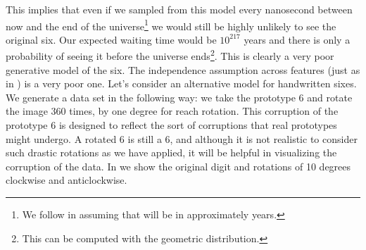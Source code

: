 This implies that even if we sampled from this model every nanosecond
between now and the end of the universe\footnote{We follow
  \cite{MacKay:information03} in assuming that will be in
  approximately  years.} we would still be highly
unlikely to see the original six. Our expected waiting time would be
$10^{217}$ years and there is only a  probability of seeing it
before the universe ends\footnote{This can be computed with the geometric distribution.}. This is clearly a very poor generative
model of the six. The independence assumption across features (just as
in ) is a very poor one. Let's consider an
alternative model for handwritten sixes. We generate a data set in the
following way: we take the prototype 6 and rotate the image 360 times,
by one degree for reach rotation. This corruption of the prototype 6
is designed to reflect the sort of corruptions that real prototypes
might undergo. A rotated 6 is still a 6, and although it is not
realistic to consider such drastic rotations as we have applied, it
will be helpful in visualizing the corruption of the data. In
 we show the original digit and rotations of
10 degrees clockwise and anticlockwise.

